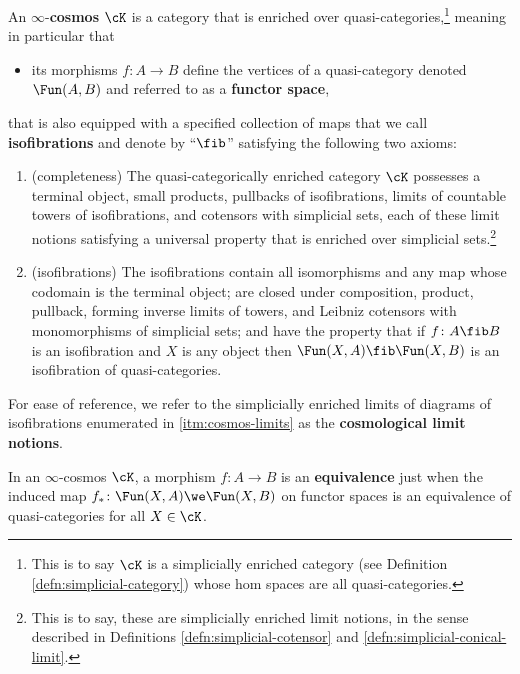 \begin{definition}\label{defn:cosmos}
\leanok
{}
  An $\infty$-\textbf{cosmos} $\cK$ is a category that is enriched over quasi-categories,\footnote{This is to say $\cK$ is a simplicially enriched category (see Definition \ref{defn:simplicial-category}) whose hom spaces are all quasi-categories.} meaning in particular that\begin{itemize}
  \item its morphisms $f \colon A \to B$ define the vertices of a quasi-category denoted $\Fun(A,B)$ and referred to as a \textbf{functor space},
  \end{itemize}
  that is also equipped with a specified collection of maps that we call \textbf{isofibrations} and denote by ``$\fib$'' satisfying the following two axioms:
  \begin{enumerate}
  \item\label{itm:cosmos-limits} (completeness) The quasi-categorically enriched category $\cK$ pos\-sess\-es a terminal object, small products, pullbacks of isofibrations, limits of countable towers of isofibrations, and cotensors with simplicial sets, each of these limit notions satisfying a universal property that is enriched over simplicial sets.\footnote{This is to say, these are simplicially enriched limit notions, in the sense described in Definitions \ref{defn:simplicial-cotensor} and \ref{defn:simplicial-conical-limit}.}
  \item\label{itm:cosmos-isofib} (isofibrations) The isofibrations contain all isomorphisms and any map whose codomain is the terminal object; are closed under composition, product, pullback, forming inverse limits of towers, and Leibniz cotensors with monomorphisms of simplicial sets; and have the property that if $f \colon A \fib B$ is an isofibration and $X$ is any object then $\Fun(X,A) \fib \Fun(X,B)$ is an isofibration of quasi-categories.
  \end{enumerate}
\end{definition}

For ease of reference, we refer to the simplicially enriched limits of diagrams of isofibrations enumerated in \ref{itm:cosmos-limits} as the \textbf{cosmological limit notions}.

\begin{definition}\label{defn:equivalence}
  In an $\infty$-cosmos $\cK$, a morphism $f\colon A \to B$ is an \textbf{equivalence} just when the induced map $f_* \colon\Fun(X,A) \we \Fun(X,B)$ on functor spaces  is an equivalence of quasi-categories for all $X \in \cK$.
\end{definition}

